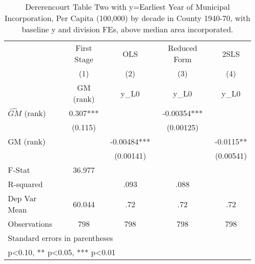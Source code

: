 \begin{table}[htbp]\centering
\def\sym#1{\ifmmode^{#1}\else\(^{#1}\)\fi}
\caption{Dererencourt Table Two with y=Earliest Year of Municipal Incorporation, Per Capita (100,000) by decade in County 1940-70, with baseline y and division FEs, above median area incorporated.}
\begin{tabular}{l*{4}{c}}
\toprule
                    & First Stage   &         OLS   &Reduced Form   &        2SLS   \\
                    &\multicolumn{1}{c}{(1)}&\multicolumn{1}{c}{(2)}&\multicolumn{1}{c}{(3)}&\multicolumn{1}{c}{(4)}\\
                    &\multicolumn{1}{c}{GM  (rank)}&\multicolumn{1}{c}{y\_L0}&\multicolumn{1}{c}{y\_L0}&\multicolumn{1}{c}{y\_L0}\\
\midrule
$\hat{GM}$ (rank)   &       0.307***&               &    -0.00354***&               \\
                    &     (0.115)   &               &   (0.00125)   &               \\
\addlinespace
GM  (rank)          &               &    -0.00484***&               &     -0.0115** \\
                    &               &   (0.00141)   &               &   (0.00541)   \\
\midrule
F-Stat              &      36.977   &               &               &               \\
R-squared           &               &        .093   &        .088   &               \\
Dep Var Mean        &      60.044   &         .72   &         .72   &         .72   \\
Observations        &         798   &         798   &         798   &         798   \\
\bottomrule
\multicolumn{5}{l}{\footnotesize Standard errors in parentheses}\\
\multicolumn{5}{l}{\footnotesize * p<0.10, ** p<0.05, *** p<0.01}\\
\end{tabular}
\end{table}
